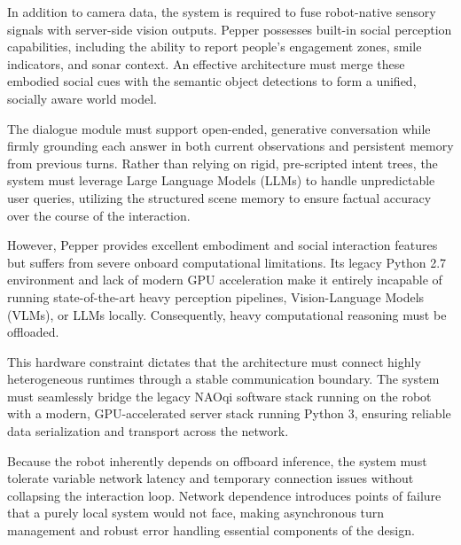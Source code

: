 In addition to camera data, the system is required to fuse robot-native sensory signals with server-side vision outputs. Pepper possesses built-in social perception capabilities, including the ability to report people's engagement zones, smile indicators, and sonar context. An effective architecture must merge these embodied social cues with the semantic object detections to form a unified, socially aware world model.

The dialogue module must support open-ended, generative conversation while firmly grounding each answer in both current observations and persistent memory from previous turns. Rather than relying on rigid, pre-scripted intent trees, the system must leverage Large Language Models (LLMs) to handle unpredictable user queries, utilizing the structured scene memory to ensure factual accuracy over the course of the interaction.

However, Pepper provides excellent embodiment and social interaction features but suffers from severe onboard computational limitations. Its legacy Python 2.7 environment and lack of modern GPU acceleration make it entirely incapable of running state-of-the-art heavy perception pipelines, Vision-Language Models (VLMs), or LLMs locally. Consequently, heavy computational reasoning must be offloaded.

This hardware constraint dictates that the architecture must connect highly heterogeneous runtimes through a stable communication boundary. The system must seamlessly bridge the legacy NAOqi software stack running on the robot with a modern, GPU-accelerated server stack running Python 3, ensuring reliable data serialization and transport across the network.

Because the robot inherently depends on offboard inference, the system must tolerate variable network latency and temporary connection issues without collapsing the interaction loop. Network dependence introduces points of failure that a purely local system would not face, making asynchronous turn management and robust error handling essential components of the design.

